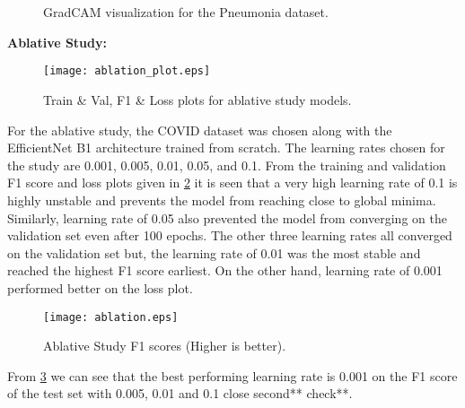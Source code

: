 \documentclass[10pt,twocolumn,letterpaper]{article}
\begin{document}
\begin{figure}
  \\
  \\
  \caption{GradCAM visualization for the Pneumonia dataset.}
  \label{fig:gradcam_pneumonia}
\end{figure}

\textbf{Ablative Study:}
\begin{figure}[t]
  \centering
  \texttt{[image: ablation\_plot.eps]}  
   \caption{Train \& Val, F1 \& Loss plots for ablative study models.}
   \label{fig:ablation_plot}
\end{figure}
For the ablative study, the COVID dataset was chosen along with the EfficientNet B1 architecture 
trained from scratch. The learning rates chosen for the study are 0.001, 0.005, 0.01, 0.05, and 0.1.
From the training and validation F1 score and loss plots given in 
\cref{fig:ablation_plot} it is seen that a very high learning rate of 0.1 is highly unstable and 
prevents the model from reaching close to global minima. Similarly, learning rate of 0.05 also prevented 
the model from converging on the validation set even after 100 epochs. The other three learning 
rates all converged on the validation set but, the learning rate of 0.01 was the most stable 
and reached the highest F1 score earliest. On the other hand, learning rate of 0.001 performed better 
on the loss plot.
\begin{figure}[t]
  \centering
  \texttt{[image: ablation.eps]}  
   \caption{Ablative Study F1 scores (Higher is better).}
   \label{fig:ablation}
\end{figure}
From \cref{fig:ablation} we can see that the best performing learning rate is 0.001 
on the F1 score of the test set with 0.005, 0.01 and 0.1 close second** check**. 






\clearpage
{\small


}
\end{document}
